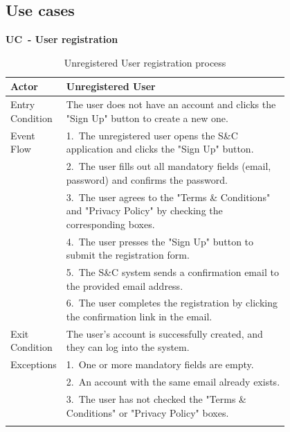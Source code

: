 \subsection{Use cases}
\label{subsec: use_cases}%

\setcounter{uc}{1}
\newcommand{\cuc}{\theuc{}}

\textbf{UC\cuc\  - User registration}

\begin{center} 
    \renewcommand{\arraystretch}{1.2} 
    \begin{longtable}{ l p{0.8\linewidth} } 
        \hline 
        Actor & Unregistered User \\ \hline 
        Entry Condition & The user does not have an account and clicks the "Sign Up" button to create a new one. \\ \hline 
        Event Flow & 1.\ The unregistered user opens the S\&C application and clicks the "Sign Up" button. \\ 
        & 2.\ The user fills out all mandatory fields (email, password) and confirms the password. \\ 
        & 3.\ The user agrees to the "Terms \& Conditions" and "Privacy Policy" by checking the corresponding boxes. \\ 
        & 4.\ The user presses the "Sign Up" button to submit the registration form. \\ 
        & 5.\ The S\&C system sends a confirmation email to the provided email address. \\ 
        & 6.\ The user completes the registration by clicking the confirmation link in the email. \\ \hline 
        Exit Condition & The user's account is successfully created, and they can log into the system. \\ \hline 
        Exceptions & 1.\ One or more mandatory fields are empty. \\ 
        & 2.\ An account with the same email already exists. \\ 
        & 3.\ The user has not checked the "Terms \& Conditions" or "Privacy Policy" boxes. \\ \hline 
        \caption{Unregistered User registration process} 
        \label{tab:user_registration_uc} 
    \end{longtable} 
\end{center}

